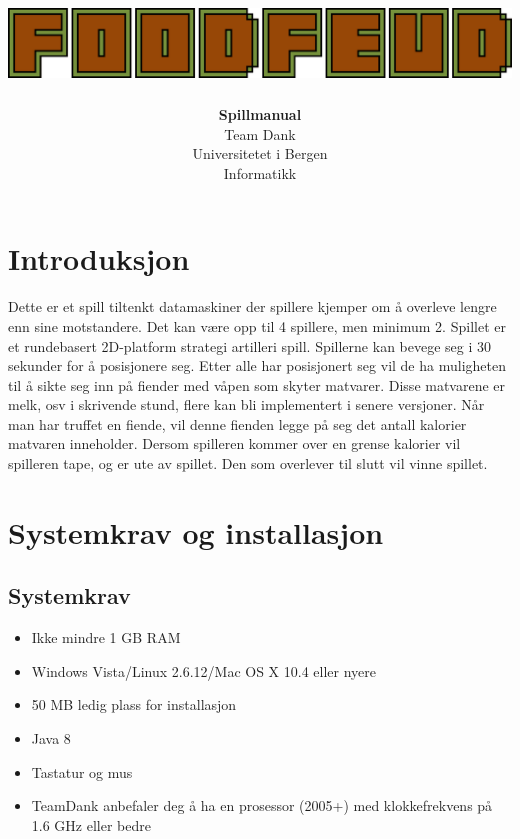\documentclass[paper=a4]{article}
\begin{document}
\title{
	\vspace*{10em}
	\includegraphics[width=1.00\textwidth]{images/logo.png}
	\vspace*{3em}
}
\author{\textbf{Spillmanual} \\
Team Dank \\
Universitetet i Bergen \\
Informatikk}
\maketitle
\newpage
\tableofcontents
\newpage

\section{Introduksjon}
Dette er et spill tiltenkt datamaskiner der spillere kjemper om å overleve lengre enn sine motstandere. Det kan være opp til 4 spillere, men minimum 2. 
Spillet er et rundebasert 2D-platform strategi artilleri spill. Spillerne kan bevege seg i 30 sekunder for å posisjonere seg. 
Etter alle har posisjonert seg vil de ha muligheten til å sikte seg inn på fiender med våpen som skyter matvarer. 
Disse matvarene er melk, osv i skrivende stund, flere kan bli implementert i senere versjoner. %
Når man har truffet en fiende, vil denne fienden legge på seg det antall kalorier matvaren inneholder. 
Dersom spilleren kommer over en grense kalorier vil spilleren tape, og er ute av spillet. Den som overlever til slutt vil vinne spillet.


\section{Systemkrav og installasjon}

\subsection{Systemkrav}
\begin{itemize}
	\item{Ikke mindre 1 GB RAM}
	\item{Windows Vista/Linux 2.6.12/Mac OS X 10.4 eller nyere}
	\item{50 MB ledig plass for installasjon}
	\item{Java 8}
	\item{Tastatur og mus}
	\item{TeamDank anbefaler deg å ha en prosessor (2005+) med klokkefrekvens på 1.6 GHz eller bedre}
\end{itemize}
\end{document}
